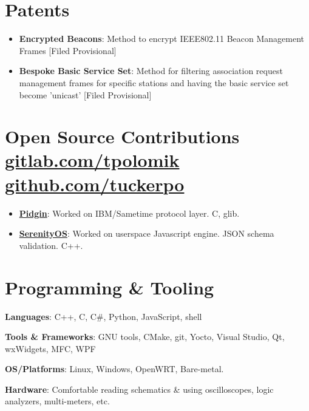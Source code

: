 \documentclass[letterpaper,11pt]{article}
\newcommand{\resumeSubHeadingListStart}{\begin{itemize}[leftmargin=*]}
\newcommand{\resumeSubHeadingListEnd}{\end{itemize}}
\begin{document}
		
	\section{Patents}
	\resumeSubHeadingListStart
	\item{
		\textbf{Encrypted Beacons}{: Method to encrypt IEEE802.11 Beacon Management Frames [Filed Provisional]}
	}
	\item{
		\textbf{Bespoke Basic Service Set}{: Method for filtering association request management frames for specific stations and having the basic service set become 'unicast' [Filed Provisional] }
	}
	\resumeSubHeadingListEnd
	
	\section{Open Source Contributions \href{https://gitlab.com/tpolomik}{\small gitlab.com/tpolomik} \href{https://github.com/tuckerpo}{\small github.com/tuckerpo}}
	\resumeSubHeadingListStart
	\item{
		\textbf{\href{https://www.pidgin.im/}{Pidgin}}{: Worked on IBM/Sametime protocol layer. C, glib.} }
	\item{
		\textbf{\href{https://github.com/SerenityOS/serenity}{SerenityOS}}{: Worked on userspace Javascript engine. JSON schema validation. C++. 
		} 
	}
	\resumeSubHeadingListEnd

	
	
	\section{Programming \& Tooling}
	\resumeSubHeadingListStart
	\item{
		\textbf{Languages}{: C++, C, C\#, Python, JavaScript, shell} }
	\hfill
	\item{
		\textbf{Tools \& Frameworks}{: GNU tools, CMake, git, Yocto, Visual Studio, Qt, wxWidgets, MFC, WPF
		}
		\item{
			\textbf{OS/Platforms}{: Linux, Windows, OpenWRT, Bare-metal.} }
		\item {
			\textbf{Hardware}{: Comfortable reading schematics \& using oscilloscopes, logic analyzers, multi-meters, etc.}}
		

	} 
	\resumeSubHeadingListEnd
	
\end{document}
